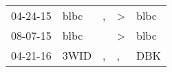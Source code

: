 \begin{supertabular}{p{0.07\textwidth}p{0.06\textwidth}p{0.02\textwidth}p{0.02\textwidth}p{0.06\textwidth}}
 04-24-15\textsuperscript{} &  blbc\textsuperscript{} &  , &  \textgreater &  blbc\textsuperscript{} \\
 08-07-15\textsuperscript{} &  blbc\textsuperscript{} &    &  \textgreater &  blbc\textsuperscript{} \\
 04-21-16\textsuperscript{} &  3WID\textsuperscript{} &  , &             , &   DBK\textsuperscript{} \\
\end{supertabular}

